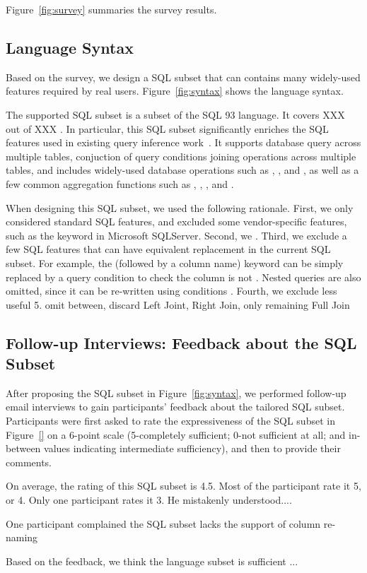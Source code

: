 Figure~\ref{fig:survey} summaries the survey results.

\subsection{Language Syntax}
\label{sec:syntax}

Based on the survey, we design a SQL subset that can contains
many widely-used features required by real users. 
Figure~\ref{fig:syntax} shows the language syntax.


The supported SQL subset is a subset of the SQL 93
language. It covers XXX out of XXX 
. In particular, this SQL subset significantly
enriches the SQL features used in existing query inference
work~\cite{DasSarma:2010}.  It supports database query
across multiple tables, conjuction of query conditions
joining operations across multiple tables, and includes
widely-used database operations such as ,
, and , as
well as a few common aggregation functions such as , ,
, and .

When designing this SQL subset, we used the following rationale.
First, we only considered standard SQL features, and excluded
some vendor-specific features, such as the  keyword
in Microsoft SQLServer. Second, we . Third, we exclude
a few SQL features that can have equivalent replacement 
in the current SQL subset. For example, the  (followed
by a column name) keyword can be simply replaced by a
query condition to check the column is not .
Nested queries are also omitted, since it can be re-written
using conditions .
Fourth, we exclude less useful
5. omit between, discard Left Joint, Right Join, only remaining Full Join



\subsection{Follow-up Interviews: Feedback about the SQL Subset}
\label{sec:interview}

After proposing the SQL subset in Figure~\ref{fig:syntax},
we performed follow-up email interviews to gain
participants' feedback about the tailored SQL
subset. Participants were first asked to rate
the expressiveness of the SQL subset in Figure~\ref{}
on a 6-point scale (5-completely sufficient; 0-not sufficient at all;
and in-between values indicating intermediate sufficiency),
and then to provide their comments.

On average, the rating of this SQL subset is 4.5. Most of
the participant rate it 5, or 4. Only one participant rates
it 3. He mistakenly understood....\todo{}

One participant complained the SQL subset lacks the support
of column re-naming

Based on the feedback, we think the language subset is
sufficient ...

